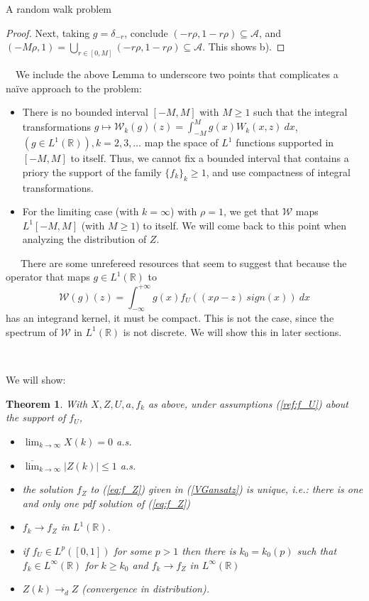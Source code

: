 \documentclass[12pt]{article}
\newtheorem*{thm}{Theorem}
\begin{document}
\begin{section}{A random walk problem}
\begin{proof}
 Next, taking $g=\delta_{-r}$, conclude $(- r \rho, 1 - r \rho) \subseteq \mathcal{A}$, and $(-M \rho,1) =  \bigcup_{r \in [0,M]} (-r \rho, 1 -r \rho) \subseteq \mathcal{A}$. This shows b).
\end{proof}

\ 
\ 
We include the above Lemma to underscore two points that complicates a na\"ive approach to the problem:
\begin{itemize}
\item[i.] There is no bounded interval $[-M,M]$ with $M\ge1$ such that the integral transformations $ g \mapsto \mathcal{W}_k(g)(z) = \int_{-M}^{M} g(x) W_k(x,z) \ dx$,  $( g \in L^1(\mathbb{R})), k = 2, 3, \dots $ map the space of $L^1$ functions supported in $[-M,M]$ to itself. Thus, we cannot fix a bounded interval that contains a priory the support of the family $\{f_k\}_k \ge 1$, and use compactness of integral transformations.  

\item[ii)] For the limiting case (with $k=\infty$) with $\rho = 1$, we get that $\mathcal{W}$ maps $L^1[-M,M]$ (with $M \ge 1$) to itself. We will come back to this point when analyzing the distribution of $Z$.
\end{itemize}


\  
\ 
\ 
There are some unrefereed resources that seem to suggest that because the operator that maps $g \in L^1(\mathbb{R})$ to $$\mathcal{W}(g)(z)=\int_{-\infty}^{+\infty} g(x) f_U\!\left(  \left(x \rho - z \right)\ sign(x) \right) \ dx$$
has an integrand kernel, it must be compact. This is not the case, since the spectrum of $\mathcal{W}$ in $L^1(\mathbb{R})$ is not discrete. We will show this in later sections.    

\  
\ 
\ 


We will show:

\begin{thm} With $X,Z,U,a, f_k$ as above, under assumptions (\ref{ref:f_U}) about the support of $f_U$,
	\begin{itemize}
	\item[a)]  $ \lim_{k \rightarrow \infty} X(k) = 0$ a.s. 
	\item[b)]  $ \overline{ \lim}_{k \rightarrow \infty} |Z(k)| \le 1 $ a.s.
	\item[c)] the solution $f_Z$ to (\ref{eq:f_Z}) given in (\ref{VGansatz}) is unique, i.e.: there is one and only one pdf solution of (\ref{eq:f_Z})
	\item[d)] $ f_k  \rightarrow f_Z$ in $L^1(\mathbb{R})$.
	\item[e)] if $f_U \in L^{p}([0,1])$ for some $p>1$ then there is $k_0 = k_0(p)$ such that $f_k \in L^{\infty}(\mathbb{R})$ for $k \ge k_0$ and 
	$ f_k  \rightarrow f_Z$ in $L^{\infty}(\mathbb{R})$
	\item[f)] $Z(k) \rightarrow_d Z$  (convergence in distribution).
	\end{itemize}
\end{thm}

\end{section}
\end{document}

